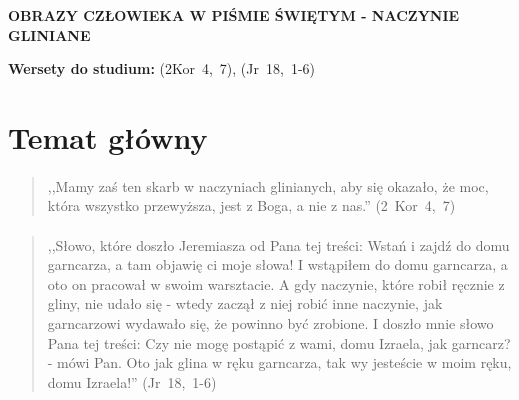 \documentclass[10pt,a4paper,oneside]{article}
\begin{document}
\centerline{\textbf{\MakeUppercase{Obrazy człowieka w Piśmie Świętym - naczynie gliniane}}}
\begin{center}
\textbf{Wersety do studium:} 
\mbox{(2Kor 4, 7)}, \mbox{(Jr 18, 1-6)}
\end{center}
\section{Temat główny}
\paragraph{}
\begin{quote}
,,Mamy zaś ten skarb w naczyniach glinianych, aby się okazało, że moc, która wszystko przewyższa, jest z Boga, a nie z nas.'' \mbox{(2 Kor 4, 7)}
\end{quote}
\paragraph{}
\begin{quote}
,,Słowo, które doszło Jeremiasza od Pana tej treści: Wstań i zajdź do domu garncarza, a tam objawię ci moje słowa! I wstąpiłem do domu garncarza, a oto on pracował w swoim warsztacie. A gdy naczynie, które robił ręcznie z gliny, nie udało się - wtedy zaczął z niej robić inne naczynie, jak garncarzowi wydawało się, że powinno być zrobione. I doszło mnie słowo Pana tej treści: Czy nie mogę postąpić z wami, domu Izraela, jak garncarz? - mówi Pan. Oto jak glina w ręku garncarza, tak wy jesteście w moim ręku, domu Izraela!'' \mbox{(Jr 18, 1-6)}
\end{quote}
\end{document}
